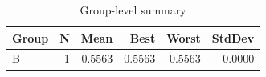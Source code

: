 \begin{table}[htbp]
\centering
\caption{Group-level summary}
\label{tab:group-summary}
\begin{tabular}{lrrrrr}
\toprule
\textbf{Group} & \textbf{N} & \textbf{Mean} & \textbf{Best} & \textbf{Worst} & \textbf{StdDev} \\
\midrule
B & 1 & 0.5563 & 0.5563 & 0.5563 & 0.0000 \\
\bottomrule
\end{tabular}
\end{table}